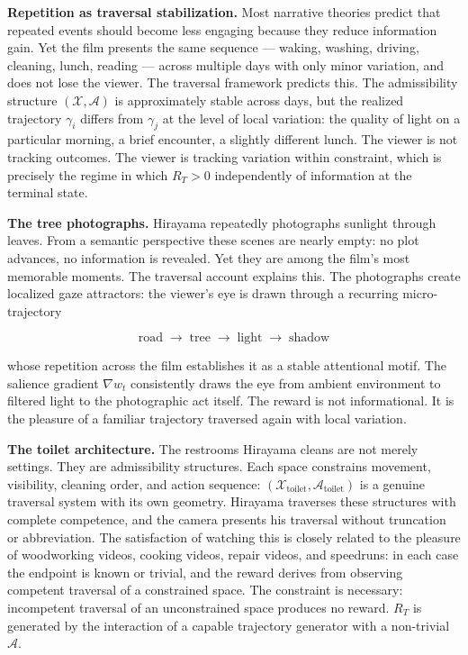 \documentclass[12pt, a4paper]{article}
\theoremstyle{plain}
\theoremstyle{definition}
\theoremstyle{remark}
\newcommand{\X}{\mathcal{X}}
\newcommand{\A}{\mathcal{A}}
\newcommand{\traj}{\gamma}
\newcommand{\salience}{w}
\newcommand{\reward}{R}
\begin{document}
\medskip
\noindent\textbf{Repetition as traversal stabilization.}
Most narrative theories predict that repeated events should
become less engaging because they reduce information gain.
Yet the film presents the same sequence --- waking, washing,
driving, cleaning, lunch, reading --- across multiple days
with only minor variation, and does not lose the viewer.
The traversal framework predicts this. The admissibility
structure $(\X, \A)$ is approximately stable across days,
but the realized trajectory $\traj_i$ differs from $\traj_j$
at the level of local variation: the quality of light on a
particular morning, a brief encounter, a slightly different
lunch. The viewer is not tracking outcomes. The viewer is
tracking variation within constraint, which is precisely the
regime in which $\reward_T > 0$ independently of information
at the terminal state.

\medskip
\noindent\textbf{The tree photographs.} Hirayama
repeatedly photographs sunlight through leaves. From a
semantic perspective these scenes are nearly empty: no plot
advances, no information is revealed. Yet they are among the
film's most memorable moments. The traversal account
explains this. The photographs create localized gaze
attractors: the viewer's eye is drawn through a recurring
micro-trajectory

\begin{equation}
  \text{road} \;\to\; \text{tree} \;\to\; \text{light}
  \;\to\; \text{shadow}
\end{equation}

whose repetition across the film establishes it as a stable
attentional motif. The salience gradient $\nabla \salience_t$
consistently draws the eye from ambient environment to
filtered light to the photographic act itself. The reward
is not informational. It is the pleasure of a familiar
trajectory traversed again with local variation.

\medskip
\noindent\textbf{The toilet architecture.} The restrooms
Hirayama cleans are not merely settings. They are
admissibility structures. Each space constrains movement,
visibility, cleaning order, and action sequence: $(\X_{
\text{toilet}}, \A_{\text{toilet}})$ is a genuine traversal
system with its own geometry. Hirayama traverses these
structures with complete competence, and the camera presents
his traversal without truncation or abbreviation. The
satisfaction of watching this is closely related to the
pleasure of woodworking videos, cooking videos, repair
videos, and speedruns: in each case the endpoint is known
or trivial, and the reward derives from observing competent
traversal of a constrained space. The constraint is
necessary: incompetent traversal of an unconstrained space
produces no reward. $\reward_T$ is generated by the
interaction of a capable trajectory generator with a
non-trivial $\A$.
\end{document}
